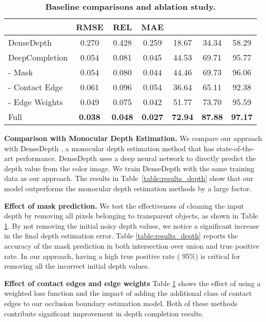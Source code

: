 \documentclass[letterpaper, 10 pt, conference]{ieeeconf}
\newcommand{\tabref}[1]{Table~\ref{#1}}
\newcommand{\myparagraph}[1]{\vspace{0.03in}\noindent\textbf{#1}}
\begin{document}
\begin{table}[ht]
\setlength{}
\centering
\caption{\textbf{Baseline comparisons and ablation study.}}
\vspace{-2mm}
\begin{tabular}{l|cccccc}
\toprule
& RMSE & REL & MAE  &  &  &  \\
\midrule
DenseDepth \cite{Alhashim2018densedepth} & 0.270 & 0.428 & 0.259 & 18.67 & 34.34 & 58.29 \\
DeepCompletion \cite{zhang2018deepdepth} & 0.054 & 0.081 & 0.045 & 44.53 & 69.71 & 95.77 \\
\midrule
- Mask          & 0.054 & 0.080 & 0.044 & 44.46 & 69.73 & 96.06 \\
- Contact Edge  & 0.061 & 0.096 & 0.054 & 36.64 & 65.11 & 92.38 \\
- Edge Weights  & 0.049 & 0.075 & 0.042 & 51.77 & 73.70 & 95.59 \\
Full            & \textbf{0.038 }& \textbf{0.048} & \textbf{0.027} & \textbf{72.94} & \textbf{87.88} &\textbf{97.17} \\
\bottomrule
\end{tabular}
\vspace{-5mm}
\label{table:ablation}
\end{table}

\myparagraph{Comparison with Monocular Depth Estimation.}
We compare our approach with DenseDepth \cite{Alhashim2018densedepth}, a monocular depth estimation method that has state-of-the-art performance. DenseDepth uses a deep neural network to directly predict the depth value from the color image. We train DenseDepth with the same training data as our approach.
The results in \tabref{table:results_depth} show that our model outperforms the monocular depth estimation methods by a large factor.

\myparagraph{Effect of mask prediction.}
We test the effectiveness of cleaning the input depth by removing all pixels belonging to transparent objects, as shown in Table \ref{table:ablation}. By not removing the initial noisy  depth values, we notice a significant increase in the final depth estimation error. 
Table \ref{table:results_depth} reports the accuracy of the mask prediction in both intersection over union and true positive rate. In our approach, having a high true positive rate ( 95\%) is critical for removing all the incorrect initial depth values.  

\myparagraph{Effect of contact edges and edge weights}
Table \ref{table:ablation} shows the effect of using a weighted loss function and the impact of adding the additional class of contact edges to our occlusion boundary estimation model. Both of these methods contribute significant improvement in depth completion results.
\end{document}
